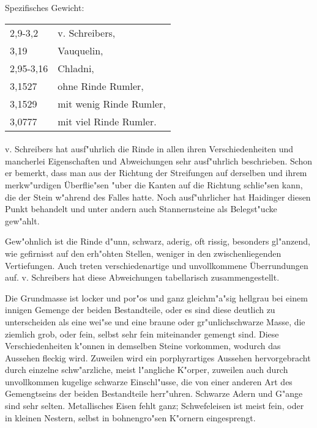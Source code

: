 \documentclass[a4paper, 11pt, oneside]{article}
\begin{document}
Spezifisches Gewicht:
\begin{table}[!ht]
    \centering
    \begin{tabular}{l l}
        2,9-3,2 & v. Schreibers,\\
        3,19 & Vauquelin,\\
        2,95-3,16 & Chladni,\\
        3,1527 & ohne Rinde Rumler,\\
        3,1529 & mit wenig Rinde Rumler,\\
        3,0777 & mit viel Rinde Rumler.
    \end{tabular}
\end{table}
\paragraph{}
v. Schreibers hat ausf"uhrlich die Rinde in allen ihren Verschiedenheiten und mancherlei Eigenschaften und Abweichungen sehr ausf"uhrlich beschrieben. Schon er bemerkt, dass man aus der Richtung der Streifungen auf derselben und ihrem merkw"urdigen Überflie"sen "uber die Kanten auf die Richtung schlie"sen kann, die der Stein w"ahrend des Falles hatte. Noch ausf"uhrlicher hat Haidinger diesen Punkt behandelt und unter andern auch Stannernsteine als Belegst"ucke gew"ahlt.

Gew"ohnlich ist die Rinde d"unn, schwarz, aderig, oft rissig, besonders gl"anzend, wie gefirnisst auf den erh"ohten Stellen, weniger in den zwischenliegenden Vertiefungen. Auch treten verschiedenartige und unvollkommene Überrundungen auf. v. Schreibers hat diese Abweichungen tabellarisch zusammengestellt.

Die Grundmasse ist locker und por"os und ganz gleichm"a"sig hellgrau bei einem innigen Gemenge der beiden Bestandteile, oder es sind diese deutlich zu unterscheiden als eine wei"se und eine braune oder gr"unlichschwarze Masse, die ziemlich grob, oder fein, selbst sehr fein miteinander gemengt sind. Diese Verschiedenheiten k"onnen in demselben Steine vorkommen, wodurch das Aussehen fleckig wird. Zuweilen wird ein porphyrartiges Aussehen hervorgebracht durch einzelne schw"arzliche, meist l"angliche K"orper, zuweilen auch durch unvollkommen kugelige schwarze Einschl"usse, die von einer anderen Art des Gemengtseins der beiden Bestandteile herr"uhren. Schwarze Adern und G"ange sind sehr selten. Metallisches Eisen fehlt ganz; Schwefeleisen ist meist fein, oder in kleinen Nestern, selbst in bohnengro"sen K"ornern eingesprengt.
\end{document}
